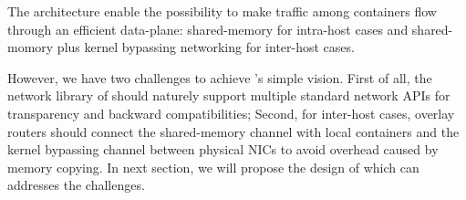 The architecture enable the possibility to make traffic among containers flow
through an efficient data-plane: shared-memory for intra-host cases and shared-momory plus kernel bypassing networking for inter-host cases.

However, we have two challenges to achieve \sysname's simple vision.
First of all, the network library of \sysname should naturely support
multiple standard network APIs for transparency and backward compatibilities;
Second, for inter-host cases, overlay routers should connect the shared-memory
channel with local containers and the kernel bypassing channel between physical NICs to avoid overhead caused by memory copying. In next section, we will propose
the design of \sysname which can addresses the challenges.

